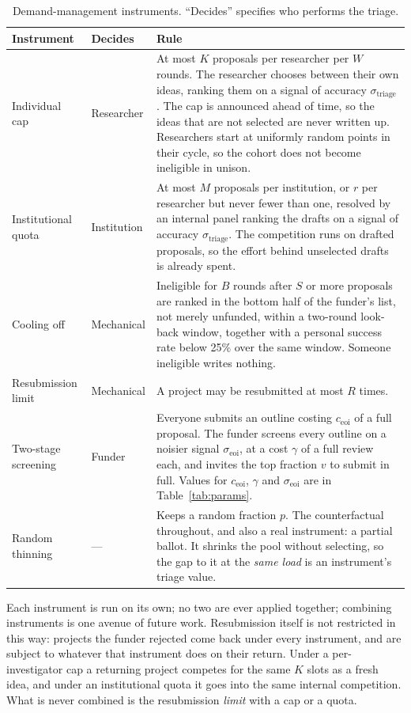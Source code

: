 \documentclass[11pt,a4paper]{article}
\begin{document}
\begin{table}[!htbp]
\centering
\small
\caption{Demand-management instruments. ``Decides'' specifies who performs the triage.}
\label{tab:instr}
\begin{tabular}{ll p{10.05cm}}
\toprule
Instrument & Decides & Rule \\
\midrule
Individual cap & Researcher
  & At most $K$ proposals per researcher per $W$ rounds. The researcher chooses
    between their own ideas, ranking them on a signal of accuracy
    $\sigma_{\text{triage}}$. The cap is announced
    ahead of time, so the ideas that are not selected are never written up.
    Researchers start at uniformly random points in their cycle, so the cohort
    does not become ineligible in unison. \\
Institutional quota & Institution
  & At most $M$ proposals per institution, or $r$ per researcher but never fewer
    than one, resolved by an
    internal panel ranking the drafts on a signal of accuracy
    $\sigma_{\text{triage}}$. The competition runs on drafted proposals, so the
    effort behind unselected drafts is already spent. \\
Cooling off & Mechanical
  & Ineligible for $B$ rounds after $S$ or more proposals are ranked in the bottom
    half of the funder's list, not merely unfunded, within a two-round look-back
    window, together with a personal success rate below 25\% over the same
    window. Someone ineligible writes
    nothing. \\
Resubmission limit & Mechanical
  & A project may be resubmitted at most $R$ times. \\
Two-stage screening & Funder
  & Everyone submits an outline costing $c_{\text{eoi}}$ of a full proposal. The
    funder screens every outline on a noisier signal $\sigma_{\text{eoi}}$, at a
    cost $\gamma$ of a full review each, and invites the top fraction $v$ to submit
    in full. Values for $c_{\text{eoi}}$, $\gamma$ and $\sigma_{\text{eoi}}$ are in
    Table~\ref{tab:params}. \\
\midrule
Random thinning & ---
  & Keeps a random fraction $p$. The counterfactual throughout, and also a real
    instrument: a partial ballot. It shrinks the pool without selecting, so the
    gap to it at the \emph{same load} is an instrument's triage value. \\
\bottomrule
\end{tabular}
\end{table}

Each instrument is run on its own; no two are ever applied together; combining instruments is one avenue of future work.
Resubmission itself is not restricted in this way: projects the funder
rejected come back under every instrument, and are subject to whatever that
instrument does on their return. Under a per-investigator cap a returning project competes for the
same $K$ slots as a fresh idea, and under an institutional quota it goes into the
same internal competition. What is never combined is the resubmission
\emph{limit} with a cap or a quota.
\end{document}
